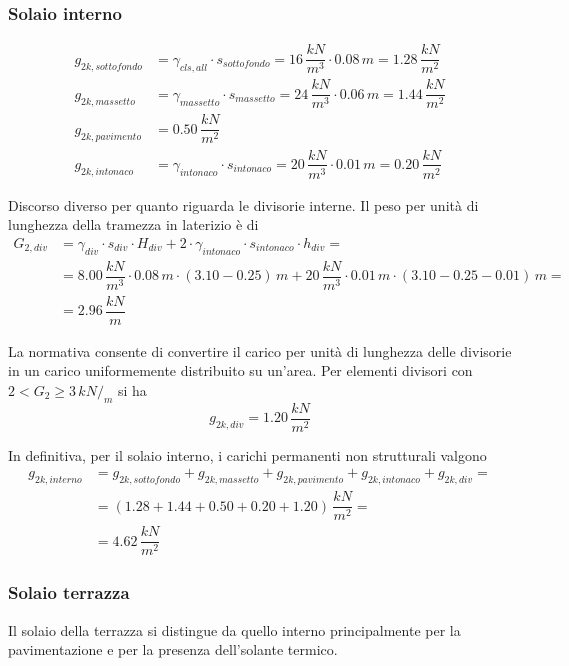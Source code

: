 \subsubsection*{Solaio interno}

\begin{align*}
 g_{2k, sottofondo} &= \gamma_{cls, all}\cdot s_{sottofondo} = 16\,\dfrac{kN}{m^3}\cdot 0.08\,\si{m} = 1.28\,\dfrac{kN}{m^2}\\
 g_{2k, massetto} &= \gamma_{massetto}\cdot
 s_{massetto} = 24\,\dfrac{kN}{m^3}\cdot 0.06\,\si{m} = 1.44\,\dfrac{kN}{m^2}\\
 g_{2k, pavimento} &= 0.50\,\dfrac{kN}{m^2}\\
 g_{2k, intonaco} &= \gamma_{intonaco}\cdot s_{intonaco} = 20\,\dfrac{kN}{m^3}\cdot 0.01\,\si{m} = 0.20\,\dfrac{kN}{m^2}
\end{align*}

Discorso diverso per quanto riguarda le divisorie interne. Il peso per unità di lunghezza della tramezza in laterizio è di 
\begin{align*}
 G_{2, div} &= \gamma_{div} \cdot s_{div} \cdot H_{div} + 2 \cdot \gamma_{intonaco} \cdot s_{intonaco} \cdot h_{div} =\\ &= 8.00\,\dfrac{kN}{m^3}\cdot 0.08\,\si{m} \cdot (3.10 - 0.25)\,\si{m} + 20\,\dfrac{kN}{m^3}\cdot 0.01\,\si{m} \cdot (3.10 - 0.25 - 0.01)\,\si{m}=\\ &= 2.96\,\dfrac{kN}{m}
 \end{align*}
 
 La normativa consente di convertire il carico per unità di lunghezza  delle divisorie in un carico uniformemente distribuito su un'area. Per elementi divisori con $2<G_2 \geq 3\,kN/_m$ si ha
 \[
  g_{2k, div} = 1.20\,\dfrac{kN}{m^2}
 \]
 
 In definitiva, per il solaio interno, i carichi permanenti non strutturali valgono
 \begin{align*}
	g_{2k, interno} &= g_{2k, sottofondo} + g_{2k, massetto} + g_{2k, pavimento} + g_{2k, intonaco} + g_{2k, div}=\\ &= (1.28 + 1.44 + 0.50 + 0.20 + 1.20)\,\dfrac{kN}{m^2} =\\&=
	4.62\,\dfrac{kN}{m^2}
 \end{align*}
 
 \subsubsection*{Solaio terrazza}
 Il solaio della terrazza si distingue da quello interno principalmente per la pavimentazione e per la presenza dell'solante termico.

